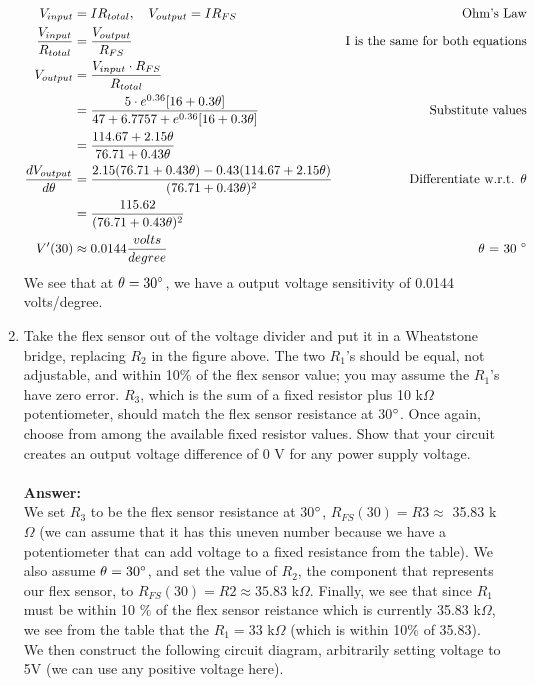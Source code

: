 \documentclass[12pt, a4paper]{article}
\begin{document}
\begin{enumerate}
\begin{align*}
V_{input} &= IR_{total}, \quad V_{output} = IR_{FS} &\text{Ohm's Law} \\
\frac{V_{input}}{R_{total}} &= \frac{V_{output}}{R_{FS}} &\text{I is the same for both equations} \\
V_{output} &= \frac{V_{input} \cdot R_{FS}}{R_{total}} \\
 &= \frac{5 \cdot  e^{0.36} [16 + 0.3 \theta]}{47 + 6.7757 + e^{0.36} [16 + 0.3 \theta]} &\text{Substitute values}\\
&= \frac{114.67 + 2.15 \theta}{76.71 + 0.43\theta} \\
\frac{dV_{output}}{d\theta} &= \frac{2.15(76.71 + 0.43\theta) - 0.43(114.67 + 2.15 \theta)}{(76.71 + 0.43\theta)^2} &\text{Differentiate w.r.t. $\theta$}\\
&= \frac{115.62}{(76.71 + 0.43\theta)^2} \\
V'(30) &\approx 0.0144 \frac{volts}{degree}&\text{$\theta$ = 30 $\degree$}
\end{align*}
We see that at $\theta = 30 \degree$, we have a output voltage sensitivity of 0.0144 volts/degree.
\item Take the flex sensor out of the voltage divider and put it in a Wheatstone bridge,
replacing $R_2$ in the figure above. The two $R_1$’s should be equal, not adjustable, and within
10$\%$ of the flex sensor value; you may assume the $R_1$’s have zero error. $R_3$, which is the
sum of a fixed resistor plus 10 k$\Omega$ potentiometer, should match the flex sensor resistance at
30$\degree$. Once again, choose from among the available fixed resistor values. Show that your
circuit creates an output voltage difference of 0 V for any power supply voltage. \\ \\
\textbf{Answer: } \\
We set $R_3$ to be the flex sensor resistance at 30$\degree$, $R_{FS}(30) = R3 \approx$ 35.83 k$\Omega$ (we can assume that it has this uneven number because we have a potentiometer that can add voltage to a fixed resistance from the table). We also assume $\theta = 30 \degree$, and set the value of $R_2$, the component that represents our flex sensor, to $R_{FS}(30) = R2 \approx 35.83$ k$\Omega$. Finally, we see that since $R_1$ must be within 10 $\%$ of the flex sensor reistance which is currently 35.83 k$\Omega$, we see from the table that the $R_1 = 33$ k$\Omega$ (which is within 10$\%$ of 35.83). We then construct the following circuit diagram, arbitrarily setting voltage to 5V (we can use any positive voltage here). \\

\end{enumerate}
\end{document}
